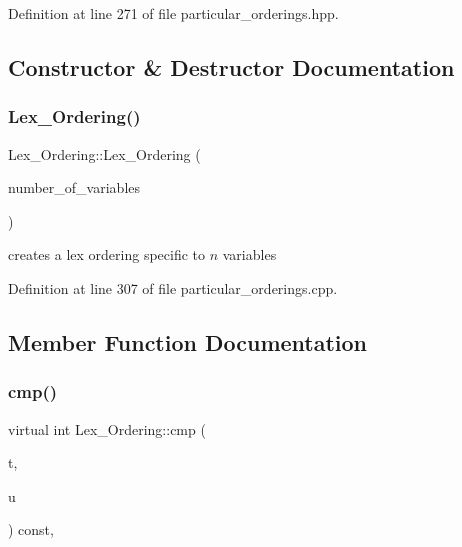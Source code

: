 Definition at line 271 of file particular\+\_\+orderings.\+hpp.



\subsection{Constructor \& Destructor Documentation}
\mbox{\label{class_lex___ordering_a35968aecc4009c0d15bfd357ccf74a5f}} 
\subsubsection{\texorpdfstring{Lex\+\_\+\+Ordering()}{Lex\_Ordering()}}
{\footnotesize\ttfamily Lex\+\_\+\+Ordering\+::\+Lex\+\_\+\+Ordering (\begin{DoxyParamCaption}\item[{N\+V\+A\+R\+\_\+\+T\+Y\+PE}]{number\+\_\+of\+\_\+variables }\end{DoxyParamCaption})}

creates a lex ordering specific to $n$ variables 

Definition at line 307 of file particular\+\_\+orderings.\+cpp.



\subsection{Member Function Documentation}
\mbox{\label{class_lex___ordering_ac8ff7b60790ed86bad7b24571ff7a3d1}} 
\subsubsection{\texorpdfstring{cmp()}{cmp()}}
{\footnotesize\ttfamily virtual int Lex\+\_\+\+Ordering\+::cmp (\begin{DoxyParamCaption}\item[{const \hyperlink{class_monomial}{Monomial} \&}]{t,  }\item[{const \hyperlink{class_monomial}{Monomial} \&}]{u }\end{DoxyParamCaption}) const\hspace{0.3cm}{\ttfamily [inline]}, {\ttfamily [virtual]}}



